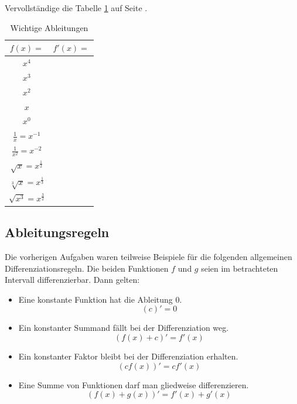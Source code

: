 \documentclass[%
11pt,%
twoside,%
titlepage,%
german,%
headsepline%
]{scrartcl}
\begin{document}
\begin{ueb}\label{uebtabelle}
Vervollst\"andige
die Tabelle \ref{tab:abl} auf Seite \pageref{tab:abl}.

\begin{table}
\large
\begin{center}
\begin{tabular}{|c|c|}
\hline
\rule[-5mm]{0pt}{13mm}$f(x)=$ & $f'(x)=$\\ \hline
\rule[-5mm]{0pt}{15mm}$x^4$ & \\ \hline
\rule[-5mm]{0pt}{15mm}$x^3$ & \\ \hline
\rule[-5mm]{0pt}{15mm}$x^2$ & \\ \hline
\rule[-5mm]{0pt}{15mm}$x$ & \\ \hline
\rule[-5mm]{0pt}{15mm}$x^0$ & \\ \hline
\rule[-5mm]{0pt}{15mm}$\frac{1}{x}=x^{-1}$ & \\ \hline
\rule[-6mm]{0pt}{16mm}$\frac{1}{x^2}=x^{-2}$ & \\ \hline
\rule[-5mm]{0pt}{17mm}$\sqrt{x}=x^{\frac{1}{2}}$ & \\ \hline
\rule[-5mm]{0pt}{17mm}$\sqrt[3]{x}=x^{\frac{1}{3}}$ & \\ \hline
\rule[-5mm]{0pt}{17mm}$\sqrt{x^3}=x^{\frac{3}{2}}$ & \\ \hline
\end{tabular}
\caption{Wichtige Ableitungen}\label{tab:abl}
\end{center}
\end{table}
\end{ueb}

\subsection{Ableitungsregeln}

Die
vorherigen Aufgaben waren teilweise Beispiele f\"ur die folgenden allgemeinen Differenziations\-regeln. Die beiden Funktionen $f$ und $g$ seien im betrachteten Intervall differenzierbar. Dann gelten:

\begin{itemize}
\item Eine konstante Funktion hat die Ableitung $0$.
$$(c)'=0$$
\item Ein konstanter Summand f\"allt bei der Differenziation weg.
$$(f(x)+c)'= f'(x)$$
\item Ein konstanter Faktor bleibt bei der Differenziation erhalten.
$$(cf(x))'=cf'(x)$$
\item Eine Summe von Funktionen darf man gliedweise differenzieren.
$$(f(x)+g(x))'=f'(x)+g'(x)$$
\end{itemize}
\end{document}
